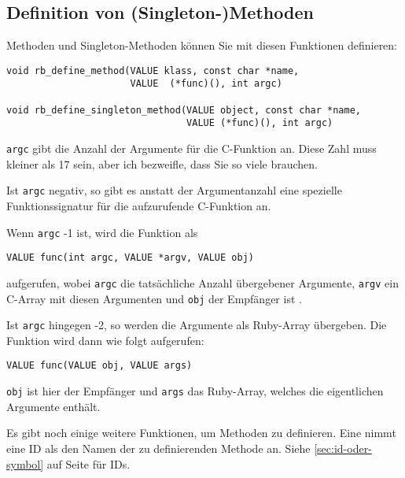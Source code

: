 \subsection{Definition von (Singleton-)Methoden}

Methoden und Singleton-Methoden können Sie mit diesen Funktionen
definieren:

\begin{lstlisting}
void rb_define_method(VALUE klass, const char *name,
                      VALUE  (*func)(), int argc)

void rb_define_singleton_method(VALUE object, const char *name,
                                VALUE (*func)(), int argc)
\end{lstlisting}

\noindent\verb+argc+ gibt die Anzahl der Argumente für die C-Funktion an. Diese
Zahl muss kleiner als 17 sein, aber ich bezweifle, dass Sie so viele
brauchen. 

Ist \verb+argc+ negativ, so gibt es anstatt der Argumentanzahl eine
spezielle Funktionssignatur für die aufzurufende C-Funktion an.

Wenn \verb+argc+ -1 ist, wird die Funktion als

\begin{lstlisting}
VALUE func(int argc, VALUE *argv, VALUE obj)
\end{lstlisting}

\noindent aufgerufen, wobei \verb+argc+ die tatsächliche Anzahl übergebener
Argumente, \verb+argv+ ein C-Array mit diesen Argumenten und
\verb+obj+ der Empfänger ist .

Ist \verb+argc+ hingegen -2, so werden die Argumente als Ruby-Array
übergeben. Die Funktion wird dann wie folgt aufgerufen:

\begin{lstlisting}
VALUE func(VALUE obj, VALUE args)
\end{lstlisting}

\noindent\verb+obj+ ist hier der Empfänger  und \verb+args+
das Ruby-Array, welches die eigentlichen Argumente enthält.

Es gibt noch einige weitere Funktionen, um Methoden zu
definieren. Eine nimmt eine ID als den Namen der zu definierenden
Methode an. Siehe \ref{sec:id-oder-symbol} auf Seite
\pageref{sec:id-oder-symbol} für IDs.

